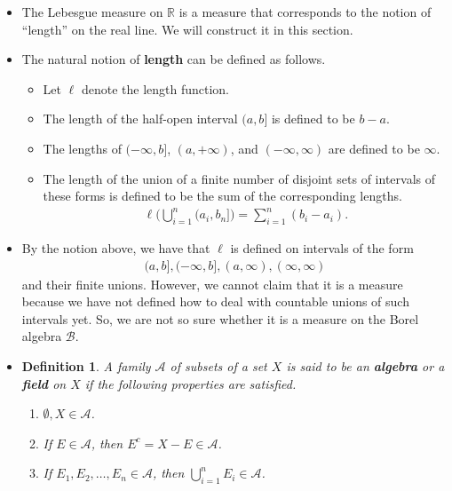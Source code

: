 \documentclass[10pt]{article}
\newtheorem{definition}[lemma]{Definition}
\newcommand{\mcal}[1]{\mathcal{#1}}
\newcommand{\Real}{\mathbb{R}}
\begin{document}
\begin{itemize}
  \item The Lebesgue measure on $\Real$ is a measure that corresponds to the notion of ``length'' on the real line. We will construct it in this section.
  
  \item The natural notion of {\bf length} can be defined as follows.
  \begin{itemize}
    \item Let $\ell$ denote the length function.
    \item The length of the half-open interval $(a,b]$ is defined to be $b - a$. 
    \item The lengths of $(-\infty, b]$, $(a, +\infty)$, and $(-\infty, \infty)$ are defined to be $\infty$.
    \item The length of the union of a finite number of disjoint sets of intervals of these forms is defined to be the sum of the corresponding lengths.
    \begin{align*}
      \ell \bigg( \bigcup_{i=1}^n (a_i, b_n] \bigg) = \sum_{i=1}^n (b_i - a_i).
    \end{align*}  
  \end{itemize}

  \item By the notion above, we have that $\ell$ is defined on intervals of the form
  \begin{align}
    (a,b], (-\infty,b], (a,\infty), (\infty,\infty) \label{half-open-intervals-spec}
  \end{align}
  and their finite unions. However, we cannot claim that it is a measure because we have not defined how to deal with countable unions of such intervals yet. So, we are not so sure whether it is a measure on the Borel algebra $\mcal{B}$.

  \item \begin{definition}
    A family $\mcal{A}$ of subsets of a set $X$ is said to be an {\bf algebra} or a {\bf field} on $X$ if the following properties are satisfied.
    \begin{enumerate}
      \item $\emptyset, X \in \mcal{A}$.
      \item If $E \in \mcal{A}$, then $E^c = X-E \in \mcal{A}$.
      \item If $E_1, E_2, \dotsc, E_n \in \mcal{A}$, then $\bigcup_{i=1}^n E_i \in \mcal{A}$.
    \end{enumerate}
  \end{definition}


\end{itemize}
\end{document}
